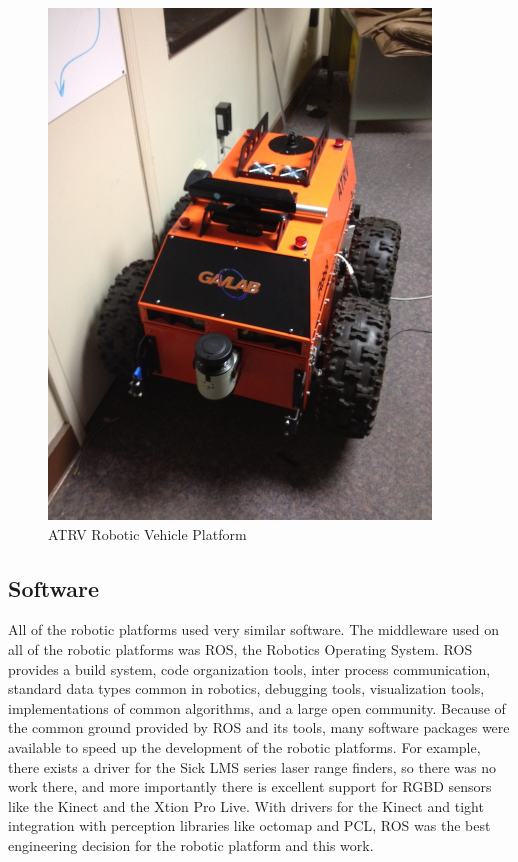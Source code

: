 \documentclass[12pt]{report}
\begin{document}
\begin{figure}[ht]
  \centering
  \includegraphics[width=4in,keepaspectratio]{atrv.jpeg}
  \caption{ATRV Robotic Vehicle Platform}
  \label{fig:atrv}
\end{figure}

\subsection{Software}
All of the robotic platforms used very similar software.  The middleware used on all of the robotic platforms was ROS, the Robotics Operating System.  ROS provides a build system, code organization tools, inter process communication, standard data types common in robotics, debugging tools, visualization tools, implementations of common algorithms, and a large open community.  Because of the common ground provided by ROS and its tools, many software packages were available to speed up the development of the robotic platforms.  For example, there exists a driver for the Sick LMS series laser range finders, so there was no work there, and more importantly there is excellent support for RGBD sensors like the Kinect and the Xtion Pro Live.  With drivers for the Kinect and tight integration with perception libraries like octomap and PCL, ROS was the best engineering decision for the robotic platform and this work.
\end{document}
